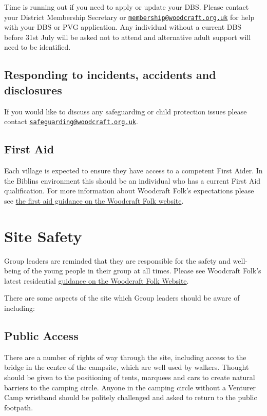 \documentclass[a4paper, 11pt]{report}
\newcommand{\nl}{\newline}
\begin{document}
Time is running out if you need to apply or update your DBS. Please contact your District Membership Secretary or \href{mailto:membership@woodcraft.org.uk}{\texttt{membership@woodcraft.org.uk}} for help with your DBS or PVG application. Any individual without a current DBS before 31st July will be asked not to attend and alternative adult support will need to be identified.

\section{Responding to incidents, accidents and disclosures}
If you would like to discuss any safeguarding or child protection issues please contact \href{mailto:safeguarding@woodcraft.org.uk}{\texttt{safeguarding@woodcraft.org.uk}}.

\section{First Aid}
Each village is expected to ensure they have access to a competent First Aider. In the Biblins environment this should be an individual who has a current First Aid qualification. For more information about Woodcraft Folk's expectations please see \href{https://woodcraft.org.uk/resources/first-aid-guidance/}{the first aid guidance on the Woodcraft Folk website}.

\chapter{Site Safety}
Group leaders are reminded that they are responsible for the safety and well-being of the young people in their group at all times. Please see Woodcraft Folk's latest residential \href{https://woodcraft.org.uk/group-guidance/camping-and-residentials/}{guidance on the Woodcraft Folk Website}. \nl

There are some aspects of the site which Group leaders should be aware of including:
\section{Public Access}
There are a number of rights of way through the site, including access to the bridge in the centre of the campsite, which are well used by walkers. Thought should be given to the positioning of tents, marquees and cars to create natural barriers to the camping circle. Anyone in the camping circle without a Venturer Camp wristband should be politely challenged and asked to return to the public footpath.
\end{document}
